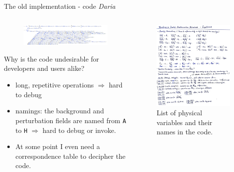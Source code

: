 \documentclass[11pt,aspectratio=169]{beamer}
\begin{document}
\begin{frame}{The old implementation - code \textit{Daria}}
	\begin{columns}
	\begin{column}{.6\linewidth}
		\begin{figure}
			\centering
			\includegraphics[width=\linewidth]{elements/Mathematica_snippet_1.png}
		\end{figure}
		Why is the code undesirable for \textcolor{ETHRed}{developers} and \textcolor{ETHBlue}{users} alike?
		\begin{itemize}
			\item long, repetitive operations $\Longrightarrow$ hard to \textcolor{ETHRed}{debug}
			\item namings: the background and perturbation fields are named from \texttt{A} to \texttt{H} $\Longrightarrow$ hard to \textcolor{ETHRed}{debug} or \textcolor{ETHBlue}{invoke}.
			\item At some point I even need a correspondence table to decipher the code.
		\end{itemize}
	\end{column}
	\pause
	\begin{column}{.4\linewidth}
		\begin{figure}
			\centering
			\includegraphics[width=.9\linewidth]{elements/correspondence_table.jpeg}
			\caption{List of physical variables and their names in the code.}
		\end{figure}
	\end{column}
	\end{columns}
\end{frame}
\end{document}
